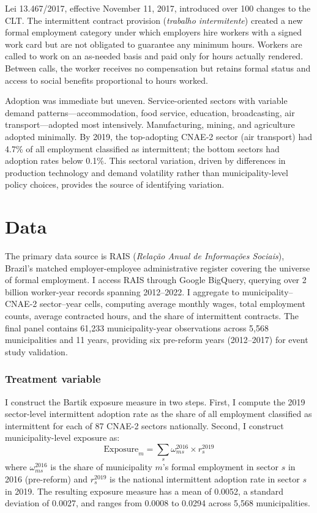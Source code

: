 \documentclass[12pt]{article}
\begin{document}
Lei 13.467/2017, effective November 11, 2017, introduced over 100 changes to the CLT. The intermittent contract provision (\textit{trabalho intermitente}) created a new formal employment category under which employers hire workers with a signed work card but are not obligated to guarantee any minimum hours. Workers are called to work on an as-needed basis and paid only for hours actually rendered. Between calls, the worker receives no compensation but retains formal status and access to social benefits proportional to hours worked.

Adoption was immediate but uneven. Service-oriented sectors with variable demand patterns---accommodation, food service, education, broadcasting, air transport---adopted most intensively. Manufacturing, mining, and agriculture adopted minimally. By 2019, the top-adopting CNAE-2 sector (air transport) had 4.7\% of all employment classified as intermittent; the bottom sectors had adoption rates below 0.1\%. This sectoral variation, driven by differences in production technology and demand volatility rather than municipality-level policy choices, provides the source of identifying variation.

\section{Data}

The primary data source is RAIS (\textit{Relação Anual de Informações Sociais}), Brazil's matched employer-employee administrative register covering the universe of formal employment. I access RAIS through Google BigQuery, querying over 2 billion worker-year records spanning 2012--2022. I aggregate to municipality--CNAE-2 sector--year cells, computing average monthly wages, total employment counts, average contracted hours, and the share of intermittent contracts. The final panel contains 61,233 municipality-year observations across 5,568 municipalities and 11 years, providing six pre-reform years (2012--2017) for event study validation.

\subsubsection*{Treatment variable} I construct the Bartik exposure measure in two steps. First, I compute the 2019 sector-level intermittent adoption rate as the share of all employment classified as intermittent for each of 87 CNAE-2 sectors nationally. Second, I construct municipality-level exposure as:
\begin{equation}
\text{Exposure}_m = \sum_s \omega_{ms}^{2016} \times r_s^{2019}
\end{equation}
where $\omega_{ms}^{2016}$ is the share of municipality $m$'s formal employment in sector $s$ in 2016 (pre-reform) and $r_s^{2019}$ is the national intermittent adoption rate in sector $s$ in 2019. The resulting exposure measure has a mean of 0.0052, a standard deviation of 0.0027, and ranges from 0.0008 to 0.0294 across 5,568 municipalities.
\end{document}
